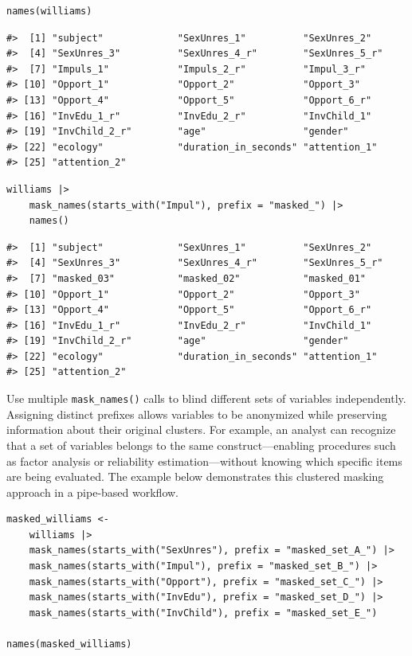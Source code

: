 \begin{verbatim}
names(williams)
\end{verbatim}

\begin{verbatim}
#>  [1] "subject"             "SexUnres_1"          "SexUnres_2"         
#>  [4] "SexUnres_3"          "SexUnres_4_r"        "SexUnres_5_r"       
#>  [7] "Impuls_1"            "Impuls_2_r"          "Impul_3_r"          
#> [10] "Opport_1"            "Opport_2"            "Opport_3"           
#> [13] "Opport_4"            "Opport_5"            "Opport_6_r"         
#> [16] "InvEdu_1_r"          "InvEdu_2_r"          "InvChild_1"         
#> [19] "InvChild_2_r"        "age"                 "gender"             
#> [22] "ecology"             "duration_in_seconds" "attention_1"        
#> [25] "attention_2"
\end{verbatim}

\begin{verbatim}
williams |> 
    mask_names(starts_with("Impul"), prefix = "masked_") |> 
    names()
\end{verbatim}

\begin{verbatim}
#>  [1] "subject"             "SexUnres_1"          "SexUnres_2"         
#>  [4] "SexUnres_3"          "SexUnres_4_r"        "SexUnres_5_r"       
#>  [7] "masked_03"           "masked_02"           "masked_01"          
#> [10] "Opport_1"            "Opport_2"            "Opport_3"           
#> [13] "Opport_4"            "Opport_5"            "Opport_6_r"         
#> [16] "InvEdu_1_r"          "InvEdu_2_r"          "InvChild_1"         
#> [19] "InvChild_2_r"        "age"                 "gender"             
#> [22] "ecology"             "duration_in_seconds" "attention_1"        
#> [25] "attention_2"
\end{verbatim}

Use multiple \texttt{mask\_names()} calls to blind different sets of variables independently. Assigning distinct prefixes allows variables to be anonymized while preserving information about their original clusters. For example, an analyst can recognize that a set of variables belongs to the same construct---enabling procedures such as factor analysis or reliability estimation---without knowing which specific items are being evaluated. The example below demonstrates this clustered masking approach in a pipe-based workflow.

\begin{verbatim}
masked_williams <- 
    williams |> 
    mask_names(starts_with("SexUnres"), prefix = "masked_set_A_") |>  
    mask_names(starts_with("Impul"), prefix = "masked_set_B_") |> 
    mask_names(starts_with("Opport"), prefix = "masked_set_C_") |> 
    mask_names(starts_with("InvEdu"), prefix = "masked_set_D_") |> 
    mask_names(starts_with("InvChild"), prefix = "masked_set_E_")

names(masked_williams)
\end{verbatim}

